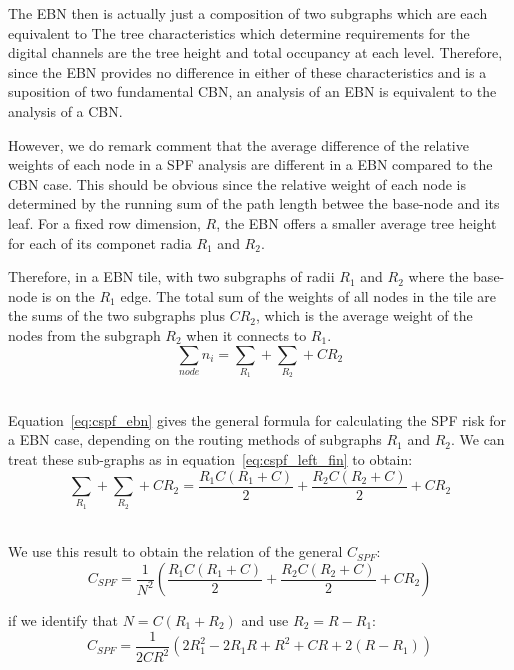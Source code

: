 


The EBN then is actually just a composition of two subgraphs which are each equivalent to The tree characteristics which determine requirements for the digital channels are the tree height and total occupancy at each level.
Therefore, since the EBN provides no difference in either of these characteristics and is a suposition of two fundamental CBN, an analysis of an EBN is equivalent to the analysis of a CBN.

However, we do remark comment that the average difference of the relative weights of each node in a SPF analysis are different in a EBN compared to the CBN case.
This should be obvious since the relative weight of each node is determined by the running sum of the path length betwee the base-node and its leaf.
For a fixed row dimension, $R$, the EBN offers a smaller average tree height for each of its componet radia $R_{1}$ and $R_{2}$.

Therefore, in a EBN tile, with two subgraphs of radii $R_{1}$ and $R_{2}$ where the base-node is on the $R_{1}$ edge.
The total sum of the weights of all nodes in the tile are the sums of the two subgraphs plus $CR_{2}$, which is the average weight of the nodes from the subgraph $R_{2}$ when it connects to $R_{1}$.
\begin{equation}
  \sum_{node}n_{i} = \sum_{R_{1}} + \sum_{R_{2}} + CR_{2}
\end{equation}~\label{eq:cspf_ebn}

Equation~\ref{eq:cspf_ebn} gives the general formula for calculating the SPF risk for a EBN case, depending on the routing methods of subgraphs $R_{1}$ and $R_{2}$.
We can treat these sub-graphs as in equation~\ref{eq:cspf_left_fin} to obtain:
\begin{equation}
  \sum_{R_{1}} + \sum_{R_{2}} + CR_{2} = \frac{R_{1}C(R_{1}+C)}{2} + \frac{R_{2}C(R_{2}+C)}{2} + CR_{2}
\end{equation}~\label{eq:cspf_e}

We use this result to obtain the relation of the general $C_{SPF}$:
\begin{equation}
  C_{SPF} = \frac{1}{N^{2}}(\frac{R_{1}C(R_{1}+C)}{2} + \frac{R_{2}C(R_{2}+C)}{2} + CR_{2})
\end{equation}

if we identify that $N = C(R_{1}+R_{2})$ and use $R_{2} = R - R_{1}$:
\begin{equation}
  C_{SPF} = \frac{1}{2CR^{2}}(2R_{1}^{2}-2R_{1}R+R^{2}+CR+2(R-R_{1}))
\end{equation}
